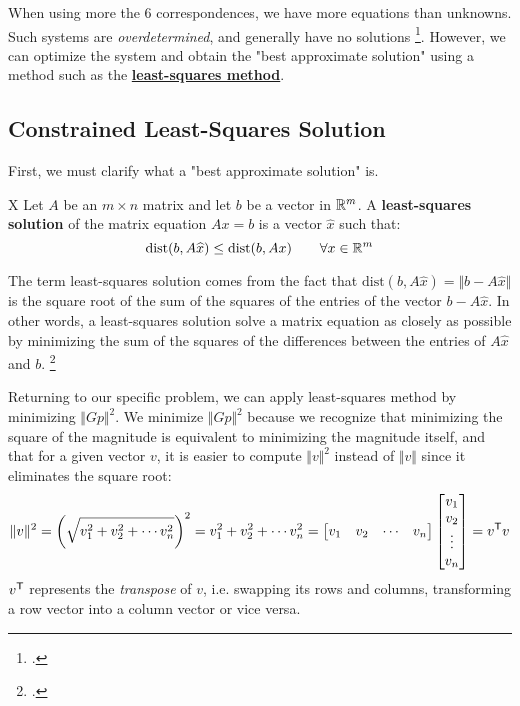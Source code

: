 When using more the 6 correspondences, we have more equations than unknowns. Such systems are \emph{overdetermined}, and generally have no solutions \footcite{williamsOverdeterminedSystems1990}. However, we can optimize the system and obtain the "best approximate solution" using a method such as the \hyperref[sec:clss]{\textbf{least-squares method}}. 

\subsection{Constrained Least-Squares Solution} \label{sec:clss}

First, we must clarify what a "best approximate solution" is. 
\begin{definition}X
    Let $A$ be an $m \times n$ matrix and let $b$ be a vector in $\mathbb{R}^m$. A \textbf{least-squares solution} of the matrix equation $Ax = b$ is a vector $\widehat{x}$ such that:
    \begin{equation*}
        \mathrm{dist}(b, A\widehat{x}) \leq \mathrm{dist}(b, Ax) \qquad \forall x \in \mathbb{R}^m
    \end{equation*}
\end{definition}

The term least-squares solution comes from the fact that $\mathrm{dist}(b, A\widehat{x})= \Vert b - A\widehat{x} \Vert$ is the square root of the sum of the squares of the entries of the vector $b - A\widehat{x}$. In other words, a least-squares solution solve a matrix equation as closely as possible by minimizing the sum of the squares of the differences between the entries of $A\widehat{x}$ and $b$. \footcite{margalitMethodLeast}

Returning to our specific problem, we can apply least-squares method by minimizing $\Vert Gp \Vert^2$. We minimize $\Vert Gp \Vert^2$ because we recognize that minimizing the square of the magnitude is equivalent to minimizing the magnitude itself, and that for a given vector $v$, it is easier to compute $\Vert v \Vert^2$ instead of $\Vert v \Vert$ since it eliminates the square root:
\begin{equation*}
    \Vert v \Vert^2
     = \left(\sqrt{v_1^2+v_2^2+ \cdots v_n^2}\right)^2 
     = v_1^2+v_2^2+ \cdots v_n^2 
     = \begin{bmatrix}
        v_1 & v_2 & \cdots & v_n
    \end{bmatrix}
    \begin{bmatrix}
        v_1 \\ v_2 \\ \vdots \\ v_n
    \end{bmatrix} 
     = v^{\mathsf{T}} v
\end{equation*}
$v^{\mathsf{T}}$ represents the \emph{transpose} of $v$, i.e. swapping its rows and columns, transforming a row vector into a column vector or vice versa.

